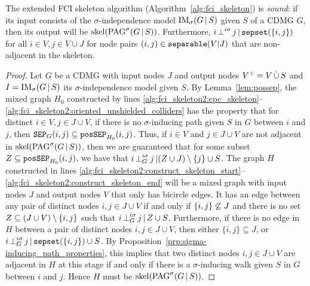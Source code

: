 \begin{Thm}\label{thm:fci_skeleton_sound}
  The extended FCI skeleton algorithm (Algorithm~\ref{alg:fci_skeleton}) is \emph{sound}: if its input consists of the $\sigma$-independence model $\mathrm{IM}_\sigma(G \operatorname*{|} S)$ given $S$ of a CDMG $G$, then its output will be $\mathrm{skel}({\mathrm{PAG}^\sigma}(G \operatorname*{|} S))$. Furthermore, $i \operatorname*{\perp}^{i\sigma} j \operatorname*{|} \mathtt{sepset}(\{i,j\})$ for all $i \in V, j \in V \cup J$ for node pairs $(i,j) \in \mathtt{separable}(V|J)$ that are non-adjacent in the skeleton.
\end{Thm}
\begin{proof}
  Let $G$ be a CDMG with input nodes $J$ and output nodes $V^+ = V \,\dot{\cup}\, S$ and $I = \mathrm{IM}_\sigma(G \operatorname*{|} S)$ its $\sigma$-independence model given $S$.
  By Lemma~\ref{lem:possep}, the mixed graph $H_0$ constructed by lines 
  \ref{alg:fci_skeleton2:cpc_skeleton}--\ref{alg:fci_skeleton2:oriented_unshielded_colliders}
  has the property that for distinct $i \in V, j \in J \cup V$, if there is no $\sigma$-inducing path given $S$ in $G$ between $i$ and $j$, then $\mathtt{SEP}_G(i,j) \subseteq \mathtt{posSEP}_{H_0}(i,j)$.
  Thus, if $i \in V$ and $j \in J \cup V$ are not adjacent in $\mathrm{skel}({\mathrm{PAG}^\sigma}(G \operatorname*{|} S))$, then we are guaranteed that for some subset $Z \subseteq \mathtt{posSEP}_{H_0}(i,j)$, we have that $i \operatorname*{\perp}^{i\sigma}_G j \operatorname*{|} (Z \cup J) \setminus \{j\} \cup S$.
  The graph $H$ constructed in lines \ref{alg:fci_skeleton2:construct_skeleton_start}--\ref{alg:fci_skeleton2:construct_skeleton_end} will be a mixed graph with input nodes $J$ and output nodes $V$ that only has bicircle edges.
  It has an edge between any pair of distinct nodes $i,j \in J\cup V$ if and only if $\{i,j\} \not\subseteq J$ and there is no set $Z \subseteq (J \cup V) \setminus \{i,j\}$ such that $i \operatorname*{\perp}^{i\sigma}_G j \operatorname*{|} Z \cup S$.
  Furthermore, if there is no edge in $H$ between a pair of distinct nodes $i,j \in J \cup V$, then either $\{i,j\} \subseteq J$, or $i \operatorname*{\perp}^{i\sigma}_G j \operatorname*{|} \mathtt{sepset}(\{i,j\}) \cup S$.
  By Proposition~\ref{prp:sigma-inducing_path_properties}, this implies that two distinct nodes $i,j \in J \cup V$ are adjacent in $H$ at this stage if and only if there is a $\sigma$-inducing walk given $S$ in $G$ between $i$ and $j$.
  Hence $H$ must be $\mathrm{skel}({\mathrm{PAG}^\sigma}(G \operatorname*{|} S))$.
\end{proof}



